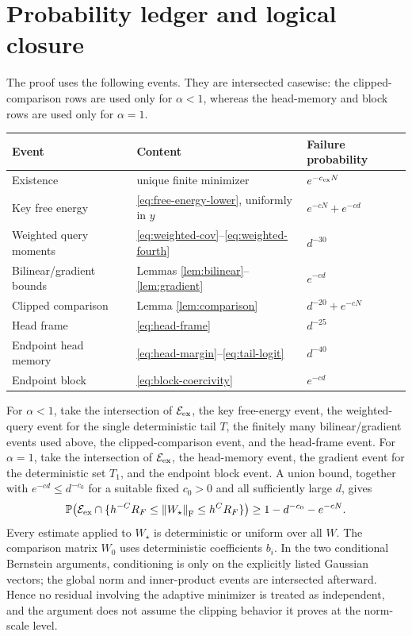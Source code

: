 \documentclass[11pt]{article}
\theoremstyle{remark}
\newcommand{\Pp}{\mathbb P}
\newcommand{\norm}[1]{\left\lVert #1\right\rVert}
\newcommand{\F}{\mathrm{F}}
\newcommand{\1}{\mathbf 1}
\begin{document}
\section{Probability ledger and logical closure}

The proof uses the following events.  They are intersected
casewise: the clipped-comparison rows are used only for $\alpha<1$,
whereas the head-memory and block rows are used only for $\alpha=1$.
\begin{center}
\begin{tabular}{lll}
\hline
Event & Content & Failure probability\\
\hline
Existence & unique finite minimizer & $e^{-c_{\rm ex}N}$\\
Key free energy & \eqref{eq:free-energy-lower}, uniformly in $y$ & $e^{-cN}+e^{-cd}$\\
Weighted query moments & \eqref{eq:weighted-cov}--\eqref{eq:weighted-fourth} & $d^{-30}$\\
Bilinear/gradient bounds & Lemmas \ref{lem:bilinear}--\ref{lem:gradient} & $e^{-cd}$\\
Clipped comparison & Lemma \ref{lem:comparison} & $d^{-20}+e^{-cN}$\\
Head frame & \eqref{eq:head-frame} & $d^{-25}$\\
Endpoint head memory & \eqref{eq:head-margin}--\eqref{eq:tail-logit} & $d^{-40}$\\
Endpoint block & \eqref{eq:block-coercivity} & $e^{-cd}$\\
\hline
\end{tabular}
\end{center}
For $\alpha<1$, take the intersection of
$\mathcal E_{\rm ex}$, the key free-energy event, the weighted-query
event for the single deterministic tail $T$, the finitely many
bilinear/gradient events used above, the clipped-comparison event, and
the head-frame event.  For $\alpha=1$, take the intersection of
$\mathcal E_{\rm ex}$, the head-memory event, the gradient event for
the deterministic set $T_1$, and the endpoint block event.  A union
bound, together with $e^{-cd}\leq d^{-c_0}$ for a suitable fixed
$c_0>0$ and all sufficiently large $d$, gives
\[
 \Pp\!\left(
 \mathcal E_{\rm ex}\cap
 \{h^{-C}R_F\leq\norm{W_\star}_{\F}\leq h^CR_F\}
 \right)
 \geq1-d^{-c_0}-e^{-cN}.
\]
Every estimate applied to $W_\star$ is deterministic or uniform over
all $W$.  The comparison matrix $W_0$ uses deterministic coefficients
$b_i$.  In the two conditional Bernstein arguments, conditioning is
only on the explicitly listed Gaussian vectors; the global norm and
inner-product events are intersected afterward.  Hence no residual
involving the adaptive minimizer is treated as independent, and the
argument does not assume the clipping behavior it proves at the
norm-scale level.
\end{document}
